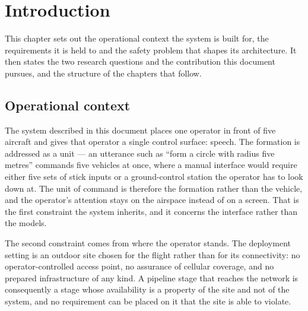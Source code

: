 %

\chapter{Introduction}
\label{chap:introduction}
This chapter sets out the operational context the system is built for, the requirements it is held
to and the safety problem that shapes its architecture. It then states the two research questions
and the contribution this document pursues, and the structure of the chapters that follow.

\section{Operational context}
\label{sec:operational-context}
The system described in this document places one operator in front of five aircraft and gives
that operator a single control surface: speech. The formation is addressed as a unit --- an
utterance such as ``form a circle with radius five metres'' commands five vehicles at once, where
a manual interface would require either five sets of stick inputs or a ground-control station the
operator has to look down at. The unit of command is therefore the formation rather than the
vehicle, and the operator's attention stays on the airspace instead of on a screen. That is the
first constraint the system inherits, and it concerns the interface rather than the models.

The second constraint comes from where the operator stands. The deployment setting is an outdoor
site chosen for the flight rather than for its connectivity: no operator-controlled access point,
no assurance of cellular coverage, and no prepared infrastructure of any kind. A pipeline stage
that reaches the network is consequently a stage whose availability is a property of the site and
not of the system, and no requirement can be placed on it that the site is able to violate.

